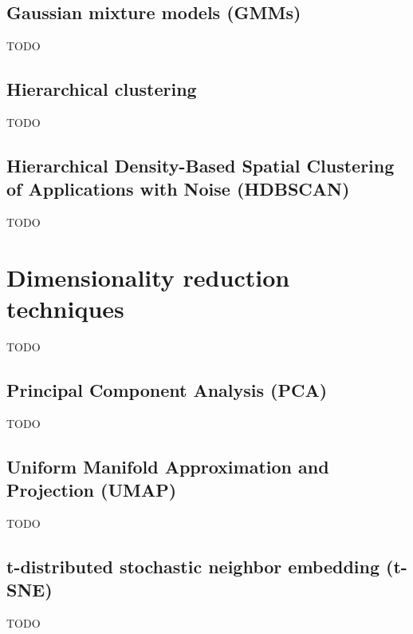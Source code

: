 \subsection{Gaussian mixture models (GMMs)}
TODO

\subsection{Hierarchical clustering}
TODO

\subsection{Hierarchical Density-Based Spatial Clustering of Applications with Noise (HDBSCAN)}
TODO

\section{Dimensionality reduction techniques}
TODO

\subsection{Principal Component Analysis (PCA)}
TODO

\subsection{Uniform Manifold Approximation and Projection (UMAP)}
TODO

\subsection{t-distributed stochastic neighbor embedding (t-SNE)}
TODO